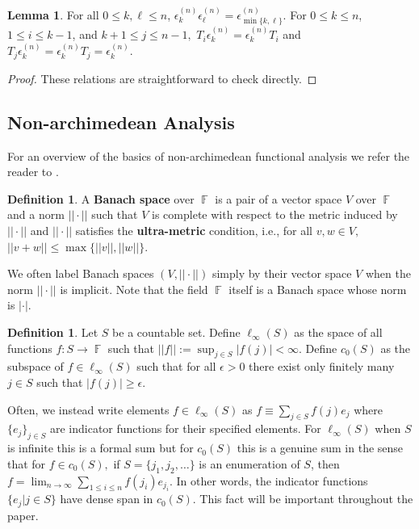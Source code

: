 \documentclass[12pt,reqno]{amsart}
\theoremstyle{definition}
\newtheorem{lem}[thm]{Lemma}
\newtheorem{defn}[thm]{Definition}
\DeclareMathOperator{\bF}{\mathbb{F}}
\begin{document}
\begin{lem}\label{lem idem relations}
    For all $0 \leq k, \ell \leq n$, $\epsilon_{k}^{(n)}\epsilon_{\ell}^{(n)} = \epsilon_{\min\{k,\ell\}}^{(n)}.$ For $0 \leq k \leq n$, $1 \leq i \leq k-1$, and $k+1 \leq j \leq n-1,$ $T_i \epsilon_{k}^{(n)} = \epsilon_{k}^{(n)} T_i$ and $T_j \epsilon_{k}^{(n)} = \epsilon_{k}^{(n)} T_j = \epsilon_{k}^{(n)}.$
\end{lem}
\begin{proof}
    These relations are straightforward to check directly.
\end{proof}

\subsection{Non-archimedean Analysis}

For an overview of the basics of non-archimedean functional analysis we refer the reader to \cite{Schneider}.

\begin{defn}
    A \textbf{Banach space} over $\bF$ is a pair of a vector space $V$ over $\bF$ and a norm $||\cdot||$ such that $V$ is complete with respect to the metric induced by $||\cdot||$ and $||\cdot||$ satisfies the \textbf{ultra-metric} condition, i.e., for all $v,w \in V,$ $||v+w || \leq \max\{ ||v||,||w||\}.$
\end{defn}

We often label Banach spaces $(V,||\cdot||)$ simply by their vector space $V$ when the norm $||\cdot||$ is implicit. Note that the field $\bF$ itself is a Banach space whose norm is $|\cdot|.$ 

\begin{defn}
    Let $S$ be a countable set. Define $\ell_{\infty}(S)$ as the space of all functions $f: S \rightarrow \bF$ such that $||f||:= \sup_{j \in S} |f(j)| < \infty.$ Define $c_0(S)$ as the subspace of $f\in \ell_{\infty}(S)$ such that for all $\epsilon > 0$ there exist only finitely many $j\in S$ such that $|f(j)|\geq \epsilon.$
\end{defn}

Often, we instead write elements $f\in \ell_{\infty}(S)$ as $f \equiv \sum_{j \in S} f(j) e_{j}$ where $\{e_j\}_{j \in S}$ are indicator functions for their specified elements. For $\ell_{\infty}(S)$ when $S$ is infinite this is a formal sum but for $c_{0}(S)$ this is a genuine sum in the sense that for $f\in c_0(S),$ if $S = \{j_1,j_2,\dots\}$ is an enumeration of $S$, then $ f = \lim_{n \rightarrow \infty} \sum_{1\leq i \leq n} f(j_i) e_{j_i}.$ In other words, the indicator functions $\{e_{j}|j \in S\}$ have dense span in $c_0(S).$ This fact will be important throughout the paper.
\end{document}
